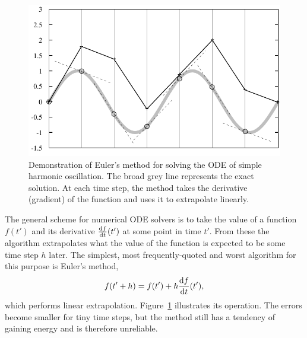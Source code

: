 \begin{figure}
\centerline{\includegraphics{figures/euler}}
\caption{Demonstration of Euler's method for solving the ODE of simple harmonic oscillation.
    The broad grey line represents the exact solution. At each time step, the method takes the
    derivative (gradient) of the function and uses it to extrapolate linearly.\label{eulersMethod}}
\end{figure}

The general scheme for numerical ODE solvers is to take the value of a function $f(t')$ and its
derivative $\frac{\mathrm{d} f}{\mathrm{d} t}(t')$ at some point in time $t'$. From these the algorithm
extrapolates what the value of the function is expected to be some time step $h$ later. The
simplest, most frequently-quoted and worst algorithm for this purpose is Euler's method,
\begin{equation}
f(t'+h) = f(t') + h\frac{\mathrm{d} f}{\mathrm{d} t}(t'),
\end{equation}
which performs linear extrapolation. Figure~\ref{eulersMethod} illustrates its operation. The
errors become smaller for tiny time steps, but the method still has a tendency of gaining energy
and is therefore unreliable.
